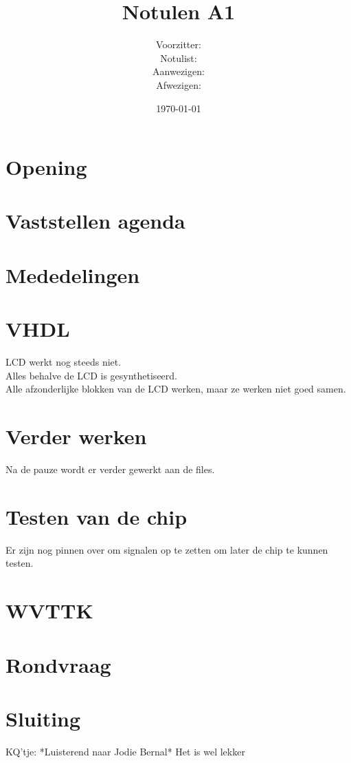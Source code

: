 \documentclass[11pt,twoside,a4paper]{article}
\title{Notulen A1}
\author{
Voorzitter:\\
Notulist:\\
Aanwezigen:\\
Afwezigen:\\
}
\date{\today}
\begin{document}
\maketitle

\section{Opening}

\section{Vaststellen agenda}

\section{Mededelingen}

\section{VHDL}
LCD werkt nog steeds niet.\\
Alles behalve de LCD is gesynthetiseerd.\\
Alle afzonderlijke blokken van de LCD werken, maar ze werken niet goed samen.

\section{Verder werken}
Na de pauze wordt er verder gewerkt aan de files.

\section{Testen van de chip}
Er zijn nog pinnen over om signalen op te zetten om later de chip te kunnen testen.

\section{WVTTK}

\section{Rondvraag}

\section{Sluiting}

\vfill
KQ'tje: *Luisterend naar Jodie Bernal* Het is wel lekker
\end{document}
